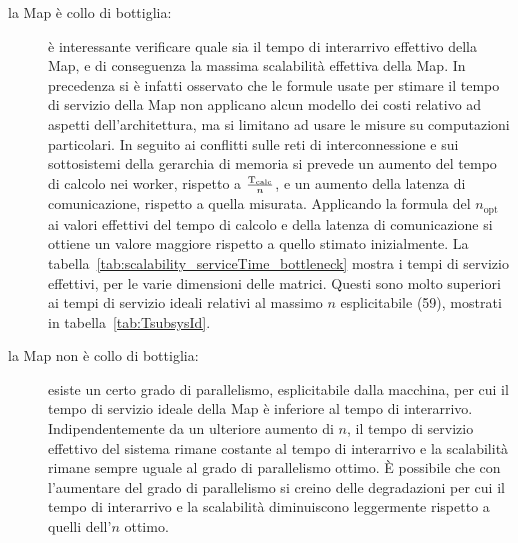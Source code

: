 \begin{description}   
\item [la Map \`e collo di bottiglia:] \`e interessante verificare quale sia il tempo di interarrivo effettivo della Map, e di conseguenza la massima scalabilit\`a effettiva della Map. In precedenza si \`e infatti osservato che le formule usate per stimare il tempo di servizio della Map non applicano alcun modello dei costi relativo ad aspetti dell'architettura, ma si limitano ad usare le misure su computazioni particolari. In seguito ai conflitti sulle reti di interconnessione e sui sottosistemi della gerarchia di memoria si prevede un aumento del tempo di calcolo nei worker, rispetto a $\frac{\mathrm{T}_{\mathrm{calc}}}{n}$, e un aumento della latenza di comunicazione, rispetto a quella misurata. Applicando la formula del $n_{\mathrm{opt}}$ ai valori effettivi del tempo di calcolo e della latenza di comunicazione si ottiene un valore maggiore rispetto a quello stimato inizialmente. 
La tabella~\ref{tab:scalability_serviceTime_bottleneck} mostra i tempi di servizio effettivi, per le varie dimensioni delle matrici. Questi sono molto superiori ai tempi di servizio ideali relativi al massimo $n$ esplicitabile (59), mostrati in tabella~\ref{tab:TsubsysId}.


\item [la Map non \`e collo di bottiglia:] esiste un certo grado di parallelismo, esplicitabile dalla macchina, per cui il tempo di servizio ideale della Map \`e inferiore al tempo di interarrivo. Indipendentemente da un ulteriore aumento di $n$, il tempo di servizio effettivo del sistema rimane costante al tempo di interarrivo e la scalabilit\`a rimane sempre uguale al grado di parallelismo ottimo. \`E possibile che con l'aumentare del grado di parallelismo si creino delle degradazioni per cui il tempo di interarrivo e la scalabilit\`a diminuiscono leggermente rispetto a quelli dell'$n$ ottimo. 


\end{description}
